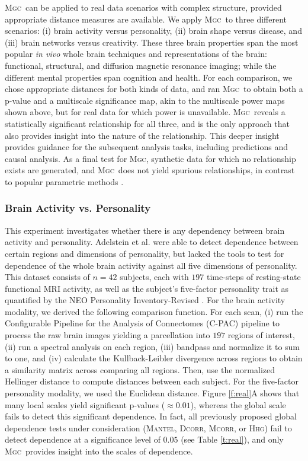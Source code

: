 \documentclass[11pt]{article}
\providecommand{\sct}[1]{{\normalfont\textsc{#1}}}
\newcommand{\Mgc}{\sct{Mgc}}
\newcommand{\Hhg}{\sct{Hhg}}
\newcommand{\Dcorr}{\sct{Dcorr}}
\newcommand{\Mcorr}{\sct{Mcorr}}
\newcommand{\Mantel}{\sct{Mantel}}
\begin{document}
\Mgc~can be applied to real data scenarios with complex structure, provided appropriate distance measures are available. We apply \Mgc~to three different scenarios: (i) brain activity versus personality, (ii) brain shape versus disease, and (iii) brain networks versus creativity.  These three brain properties span the most popular \emph{in vivo} whole brain techniques and representations of the brain: functional, structural, and diffusion magnetic resonance imaging; while the different mental properties span cognition and health.  
For each comparison, we chose appropriate distances for both kinds of data, and ran \Mgc~to obtain both a p-value and a multiscale significance map, akin to the multiscale power maps shown above, but for real data for which power is unavailable. \Mgc~reveals a statistically significant relationship for all three, and is the only approach that also provides insight into the nature of the relationship. 
This deeper insight provides guidance for the subsequent analysis tasks, including predictions and causal analysis. As a final test for \Mgc, synthetic data for which no relationship exists are generated, and \Mgc~does not yield spurious relationships, in contrast to popular parametric methods \cite{EklundKnutsson2012,Eklund2015}. 


\subsubsection*{Brain Activity vs. Personality} 

This experiment investigates whether there is any dependency between brain activity and personality.
Adelstein et al. \cite{AdelsteinEtAl2011} were able to detect dependence between certain regions and dimensions of personality, but lacked the tools to test for dependence of the whole brain activity against all five dimensions of personality. 
This dataset consists of $n=42$ subjects, each with  $197$ time-steps of resting-state functional MRI activity, as well as the subject's five-factor personality trait as quantified by  the NEO Personality Inventory-Revised  \cite{Costa1992}. 
For the brain activity modality, we derived the following comparison function. For each scan, (i) 
run the Configurable Pipeline for the Analysis of Connectomes (C-PAC) pipeline \cite{CPAC2015} to process the raw brain images yielding a parcellation into $197$ regions of interest, 
(ii) run a spectral analysis on each region, (iii) bandpass and normalize it to sum to one, and (iv) calculate the Kullback-Leibler divergence across regions to obtain a similarity matrix across comparing all regions.  Then, use the normalized Hellinger distance to compute distances between each subject. 
For the five-factor personality modality, we  used the Euclidean distance.
% 
Figure \ref{f:real}{\color{magenta}A}  shows that many local scales yield significant p-values ($\approx 0.01$), whereas the global scale fails to detect this significant dependence. In fact, all previously proposed global dependence tests under consideration (\Mantel, \Dcorr, \Mcorr, or \Hhg) fail to detect dependence at a significance level of $0.05$ (see Table \ref{t:real}), and only \Mgc~provides insight into the scales of dependence.
\end{document}
